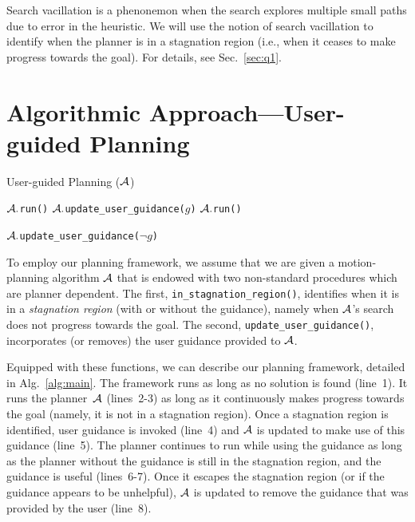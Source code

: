 \documentclass{article}
\begin{document}
Search vacillation is a phenonemon when the search explores multiple small paths due to error in the heuristic. 
We will use the notion of search vacillation to identify when the planner is in a stagnation region (i.e., when it ceases to make progress towards the goal). For details, see Sec.~\ref{sec:q1}.



\section{Algorithmic Approach---User-guided Planning}
\label{sec:high}

\algrenewcommand\algorithmicindent{.8em}
\begin{algorithm}[tb]
\caption{User-guided Planning ($\mathcal{A}$)}
\label{alg:main}	
\begin{algorithmic}[1]
\small
{} 
		\State $\mathcal{A}.$\texttt{run()}
	\EndWhile
%	
	\State $\mathcal{A}.$\texttt{update\_user\_guidance($g$)}
		\State $\mathcal{A}.$\texttt{run()}
	\EndWhile

	\State $\mathcal{A}.$\texttt{update\_user\_guidance($\neg g$)}
\EndWhile

\end{algorithmic}
\end{algorithm}



To employ our planning framework, we assume that we are given a motion-planning algorithm $\mathcal{A}$ that is endowed with two non-standard procedures which are planner dependent.
The first, \texttt{in\_stagnation\_region()}, 
identifies when it is in a \emph{stagnation region} (with or without the guidance), namely when $\mathcal{A}$'s search does not progress towards the goal. 
The second, \texttt{update\_user\_guidance()}, 
incorporates (or removes) the user guidance provided to $\mathcal{A}$. 

Equipped with these functions, we can describe our planning framework, detailed in Alg.~\ref{alg:main}.
The framework runs as long as no solution is found (line~1).
It runs the planner~$\mathcal{A}$ (lines~2-3) as long as it continuously makes progress towards the goal (namely, it is not in a stagnation region).
Once a stagnation region is identified, user guidance is invoked (line~4) and $\mathcal{A}$  is updated to make use of this guidance (line~5).
The planner continues to run while using the guidance as long as the planner without the guidance is still in the stagnation region, and the guidance is useful (lines~6-7).
Once it escapes the stagnation region (or if the guidance appears to be unhelpful), $\mathcal{A}$ is updated to remove the guidance that was provided by the user (line~8).
\end{document}
